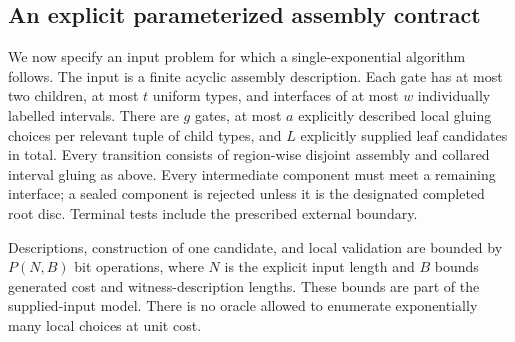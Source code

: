 \documentclass[11pt,a4paper]{article}
\theoremstyle{remark}\newtheorem{remark}[theorem]{Remark}
\begin{document}
\subsection{An explicit parameterized assembly contract}
We now specify an input problem for which a single-exponential algorithm follows. The input is a finite acyclic assembly description. Each gate has at most two children, at most $t$ uniform types, and interfaces of at most $w$ individually labelled intervals. There are $g$ gates, at most $a$ explicitly described local gluing choices per relevant tuple of child types, and $L$ explicitly supplied leaf candidates in total. Every transition consists of region-wise disjoint assembly and collared interval gluing as above. Every intermediate component must meet a remaining interface; a sealed component is rejected unless it is the designated completed root disc. Terminal tests include the prescribed external boundary.

Descriptions, construction of one candidate, and local validation are bounded by $P(N,B)$ bit operations, where $N$ is the explicit input length and $B$ bounds generated cost and witness-description lengths. These bounds are part of the supplied-input model. There is no oracle allowed to enumerate exponentially many local choices at unit cost.
\end{document}
